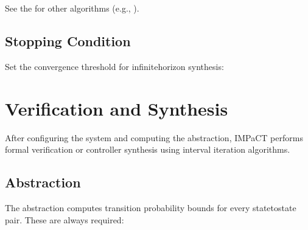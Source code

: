 \documentclass[a4paper,10pt,english]{sphinxmanual}
\begin{document}
\sphinxAtStartPar
See the 
for other algorithms (e.g., ).


\subsection{Stopping Condition}
\label{\detokenize{user-guide/configuration:stopping-condition}}
\sphinxAtStartPar
Set the convergence threshold for infinite\sphinxhyphen{}horizon synthesis:

\begin{sphinxVerbatim}[commandchars=\\\{\}]
\end{sphinxVerbatim}

\sphinxstepscope


\section{Verification and Synthesis}
\label{\detokenize{user-guide/synthesis:verification-and-synthesis}}\label{\detokenize{user-guide/synthesis::doc}}
\sphinxAtStartPar
After configuring the system and computing the abstraction, IMPaCT performs
formal verification or controller synthesis using interval iteration algorithms.


\subsection{Abstraction}
\label{\detokenize{user-guide/synthesis:abstraction}}
\sphinxAtStartPar
The abstraction computes transition probability bounds for every state\sphinxhyphen{}to\sphinxhyphen{}state pair.
These are always required:

\begin{sphinxVerbatim}[commandchars=\\\{\}]

\end{sphinxVerbatim}
\end{document}
